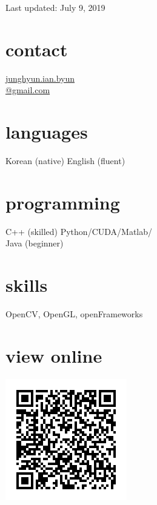 \documentclass[]{friggeri-cv}
\begin{document}
       {Last updated: July 9, 2019}

\begin{aside}
  \section{contact}
    \href{mailto:junghyun.ian.byun@gmail.com}{junghyun.ian.byun\\@gmail.com}
  \section{languages}
    Korean (native)
    English (fluent)
  \section{programming}
    C++ (skilled)
    Python/CUDA/Matlab/\\Java (beginner)
  \section{skills}
    OpenCV, OpenGL, openFrameworks
  \section{view online}
    \includegraphics[width=\textwidth]{data/cv_qr_code}
\end{aside}
\end{document}

